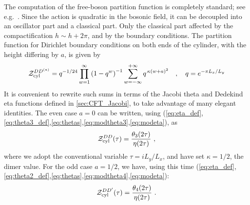 \documentclass[11pt]{iopart}
\begin{document}
The computation of the free-boson partition function is completely standard; see e.g.\ \cite{EggertAffleck,FSW,BigYellowBook}. Since the action is quadratic in the bosonic field, it can be decoupled into an oscillator part and a classical part. Only the classical part affected by the compactification $h\sim h+2\pi$, and by the boundary conditions. The partition function for Dirichlet boundary conditions on both ends of the cylinder, with the height differing by $a$, is given by
\begin{equation}
 \mathcal{Z}_{\rm cyl}^{DD^{(a)}}=q^{-1/24}\prod_{w=1}^{\infty}\left(1-q^w\right)^{-1}\sum_{w=-\infty}^{+\infty}q^{\,\kappa (w+a)^2}\quad,\quad q=e^{-\pi L_x/L_y}
\end{equation}
It is convenient to rewrite such sums in terms of the Jacobi theta and Dedekind eta functions defined in \ref{sec:CFT_Jacobi}, to take advantage of many elegant identities. 
The even case $a=0$ can be written, using (\ref{eq:eta_def},\ref{eq:theta3_def},\ref{eq:thetas},\ref{eq:modtheta3},\ref{eq:modeta}), as
\begin{equation}\label{eq:cylinder_dd}
 \mathcal{Z}_{\rm cyl}^{DD}(\tau)=\frac{\theta_3(2\tau)}{\eta(2\tau)}\ ,
\end{equation}
where we adopt the conventional variable  $\tau=i L_y/L_x$, and have set $\kappa=1/2$, the dimer value.
For the odd case $a=1/2$, we have, using this time (\ref{eq:eta_def},\ref{eq:theta2_def},\ref{eq:thetas},\ref{eq:modtheta4},\ref{eq:modeta}):
\begin{equation}
\label{eq:cylinder_ddprime}
 \mathcal{Z}_{\rm cyl}^{DD^\prime}(\tau)=\frac{\theta_4(2\tau)}{\eta(2\tau)}\ .
\end{equation}
\end{document}
